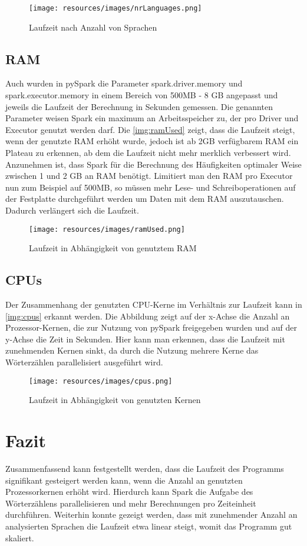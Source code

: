 \documentclass[chapterprefix=true, 12pt, a4paper, oneside, parskip=half, listof=totoc, bibliography=totoc, numbers=noendperiod]{scrbook}
\begin{document}
\begin{figure}[H]
	\texttt{[image: resources/images/nrLanguages.png]} 
	\caption{Laufzeit nach Anzahl von Sprachen}
	\label{img:languages}
\end{figure}

\subsection{RAM}
Auch wurden in pySpark die Parameter spark.driver.memory und spark.executor.memory in einem Bereich von 500MB - 8 GB angepasst und jeweils die Laufzeit der Berechnung in Sekunden gemessen. Die genannten Parameter weisen Spark ein maximum an Arbeitsspeicher zu, der pro Driver und Executor genutzt werden darf. Die \autoref{img:ramUsed} zeigt, dass die Laufzeit steigt, wenn der genutzte RAM erhöht wurde, jedoch ist ab 2GB verfügbarem RAM ein Plateau zu erkennen, ab dem die Laufzeit nicht mehr merklich verbessert wird. Anzunehmen ist, dass Spark für die Berechnung des Häufigkeiten optimaler Weise zwischen 1 und 2 GB an RAM benötigt. Limitiert man den RAM pro Executor nun zum Beispiel auf 500MB, so müssen mehr Lese- und Schreiboperationen auf der Festplatte durchgeführt werden um Daten mit dem RAM auszutauschen. Dadurch verlängert sich die Laufzeit. 

\begin{figure}[H]
	\texttt{[image: resources/images/ramUsed.png]} 
	\caption{Laufzeit in Abhängigkeit von genutztem RAM}
	\label{img:ramUsed}
\end{figure}

\subsection{CPUs}
Der Zusammenhang der genutzten CPU-Kerne im Verhältnis zur Laufzeit kann in  \autoref{img:cpus} erkannt werden. Die Abbildung zeigt auf der x-Achse die Anzahl an Prozessor-Kernen, die zur Nutzung von pySpark freigegeben wurden und auf der y-Achse die Zeit in Sekunden. Hier kann man erkennen, dass die Laufzeit mit zunehmenden Kernen sinkt, da durch die Nutzung mehrere Kerne das Wörterzählen parallelisiert ausgeführt wird.

\begin{figure}[H]
	\texttt{[image: resources/images/cpus.png]} 
	\caption{Laufzeit in Abhängigkeit von genutzten Kernen}
	\label{img:cpus}
\end{figure}


\section{Fazit}
Zusammenfassend kann festgestellt werden, dass die Laufzeit des Programms signifikant gesteigert werden kann, wenn die Anzahl an genutzten Prozessorkernen erhöht wird. Hierdurch kann Spark die Aufgabe des Wörterzählens parallelisieren und mehr Berechnungen pro Zeiteinheit durchführen. Weiterhin konnte gezeigt werden, dass mit zunehmender Anzahl an analysierten Sprachen die Laufzeit etwa linear steigt, womit das Programm gut skaliert.
\clearpage
\end{document}
